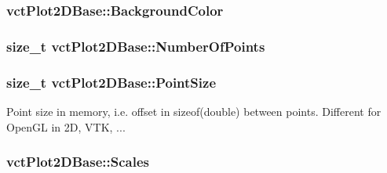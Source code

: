 \subsubsection[{Background\+Color}]{ vct\+Plot2\+D\+Base\+::\+Background\+Color\hspace{0.3cm}{\ttfamily [protected]}}\label{classvct_plot2_d_base_a74038c085cabcddebdb1195dc0062ddf}
\hypertarget{classvct_plot2_d_base_af1645f053dd8310557ec4595d43516a8}{}
\subsubsection[{Number\+Of\+Points}]{\setlength{\rightskip}{0pt plus 5cm}size\+\_\+t vct\+Plot2\+D\+Base\+::\+Number\+Of\+Points\hspace{0.3cm}{\ttfamily [protected]}}\label{classvct_plot2_d_base_af1645f053dd8310557ec4595d43516a8}
\hypertarget{classvct_plot2_d_base_a4f238d9c5cefdb5c623b4967ba0e678b}{}
\subsubsection[{Point\+Size}]{\setlength{\rightskip}{0pt plus 5cm}size\+\_\+t vct\+Plot2\+D\+Base\+::\+Point\+Size\hspace{0.3cm}{\ttfamily [protected]}}\label{classvct_plot2_d_base_a4f238d9c5cefdb5c623b4967ba0e678b}
Point size in memory, i.\+e. offset in sizeof(double) between points. Different for Open\+G\+L in 2\+D, V\+T\+K, ... \hypertarget{classvct_plot2_d_base_a614a16e1e6f461d76aeba5daf4525b08}{}
\subsubsection[{Scales}]{ vct\+Plot2\+D\+Base\+::\+Scales}\label{classvct_plot2_d_base_a614a16e1e6f461d76aeba5daf4525b08}
\hypertarget{classvct_plot2_d_base_aac54c32c843faaba49bfa0424ac4009f}{}
